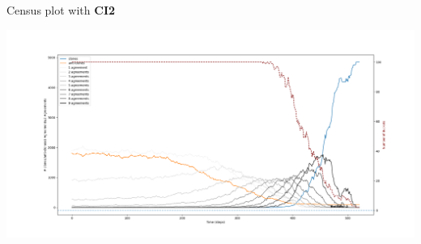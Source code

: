 \documentclass[12pt]{beamer}
\begin{document}
\begin{frame}[c]{Census plot with \textbf{CI2}} %

\vspace{-.3in}
\begin{center}
\hspace{-.6in} \includegraphics[width=1.11\textwidth]{census10issuesCI2.png}
\end{center}

\end{frame}

%


%
%
%
%
\end{document}
